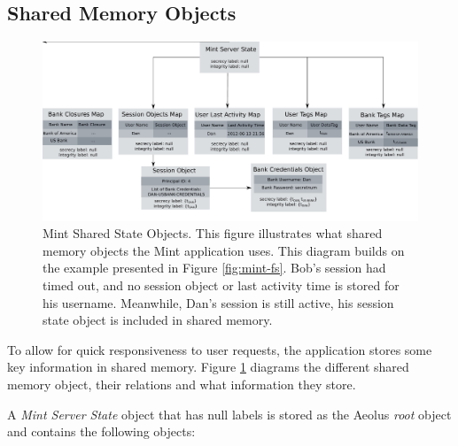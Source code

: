 \subsection{Shared Memory Objects}
\label{sec:mint-smo}

\begin{figure}[h]
\centering
\includegraphics[width=\textwidth,height=\textheight,keepaspectratio]{figures/mint-shared-state}
\caption[Mint Shared State Objects]{Mint Shared State Objects. This figure illustrates what shared memory objects the Mint application uses. This diagram builds on the example presented in Figure \ref{fig:mint-fs}. Bob's session had timed out, and no session object or last activity time is stored for his username. Meanwhile, Dan's session is still active, his session state object is included in shared memory.}
\label{fig:mint-ss}
\end{figure}

To allow for quick responsiveness to user requests, the application stores some key information in shared memory. Figure \ref{fig:mint-ss} diagrams the different shared memory object, their relations and what information they store.

A \emph{Mint Server State} object that has null labels is stored as the Aeolus \emph{root} object and contains the following objects:

